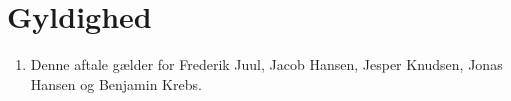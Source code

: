 \section{Gyldighed}
\begin{enumerate}
\item{Denne aftale gælder for Frederik Juul, Jacob Hansen, Jesper Knudsen, Jonas Hansen og
Benjamin Krebs.}
\end{enumerate}